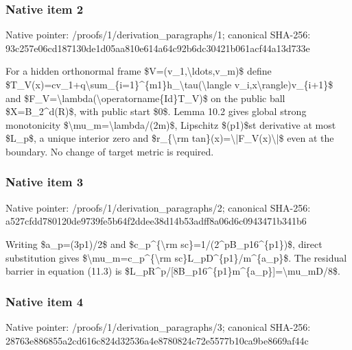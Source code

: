 \documentclass[10pt,a4paper]{article}
\begin{document}
\subsubsection{Native item 2}


Native pointer: /proofs/1/derivation\_paragraphs/1; canonical SHA-256: 93c257e06cd187130de1d05a\allowbreak{}a810e614a64c92b6dc30421b\allowbreak{}061acf44a13d733e


For a hidden orthonormal frame \$V=(v\_1,\textbackslash{}ldots,v\_m)\$ define \$T\_V(x)=cv\_1+q\textbackslash{}sum\_\{i=1\}\allowbreak{}\textasciicircum{}\{m1\}h\_\textbackslash{}tau(\textbackslash{}langle v\_i,x\textbackslash{}rangle)v\_\{i+1\}\$ and \$F\_V=\textbackslash{}lambda(\textbackslash{}operatorname\{Id\}T\_V)\$ on the public ball \$X=B\_2\textasciicircum{}d(R)\$, with public start \$0\$. Lemma 10.2 gives global strong monotonicity \$\textbackslash{}mu\_m=\textbackslash{}lambda/(2m)\$, Lipschitz \$(p1)\$st derivative at most \$L\_p\$, a unique interior zero and \$r\_\{\textbackslash{}rm tan\}(x)=\textbackslash{}|F\_V(x)\textbackslash{}|\$ even at the boundary. No change of target metric is required.


\subsubsection{Native item 3}


Native pointer: /proofs/1/derivation\_paragraphs/2; canonical SHA-256: a527cfdd780120de9739fe5b\allowbreak{}64f2ddee38d14b53adff8a06\allowbreak{}d6c0943471b341b6


Writing \$a\_p=(3p1)/2\$ and \$c\_p\textasciicircum{}\{\textbackslash{}rm sc\}=1/(2\textasciicircum{}pB\_p16\textasciicircum{}\{p1\})\$, direct substitution gives \$\textbackslash{}mu\_m=c\_p\textasciicircum{}\{\textbackslash{}rm sc\}L\_pD\textasciicircum{}\{p1\}/m\textasciicircum{}\{a\_p\}\$. The residual barrier in equation (11.3) is \$L\_pR\textasciicircum{}p/[8B\_p16\textasciicircum{}\{p1\}m\textasciicircum{}\{\allowbreak{}a\_p\}]=\textbackslash{}mu\_mD/8\$.


\subsubsection{Native item 4}


Native pointer: /proofs/1/derivation\_paragraphs/3; canonical SHA-256: 28763e886855a2cd616c824d\allowbreak{}32536a4e8780824c72e5577b\allowbreak{}10ca9be8669af44c
\end{document}
